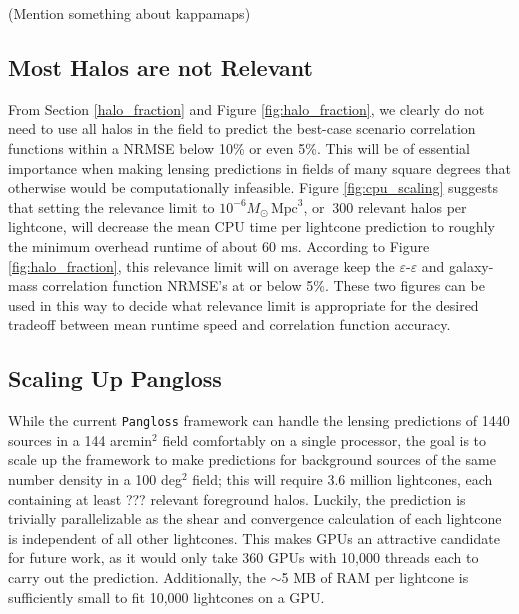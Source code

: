 \documentclass[%
 reprint,
 amsmath,amssymb,
 aps,nofootinbib
]{revtex4-1}
\begin{document}
(Mention something about kappamaps)


\subsection{Most Halos are not Relevant}

From Section \ref{halo_fraction} and Figure \ref{fig:halo_fraction}, we clearly do not need to use all halos in the field to predict the best-case scenario correlation functions within a NRMSE below 10\% or even 5\%. This will be of essential importance when making lensing predictions in fields of many square degrees that otherwise would be computationally infeasible. Figure \ref{fig:cpu_scaling} suggests that setting the relevance limit to ${10^{-6}M_\odot\,\text{Mpc}^3}$, or $~300$ relevant halos per lightcone, will decrease the mean CPU time per lightcone prediction to roughly the minimum overhead runtime of about 60 ms. According to Figure \ref{fig:halo_fraction}, this relevance limit will on average keep the $\varepsilon$-$\varepsilon$ and galaxy-mass correlation function NRMSE's at or below 5\%. These two figures can be used in this way to decide what relevance limit is appropriate for the desired tradeoff between mean runtime speed and correlation function accuracy. 


\subsection{Scaling Up Pangloss} \label{scaling_up}

While the current \texttt{Pangloss} framework can handle the lensing predictions of 1440 sources in a 144 arcmin$^2$ field comfortably on a single processor, the goal is to scale up the framework to make predictions for background sources of the same number density in a 100 deg$^2$ field; this will require 3.6 million lightcones, each containing at least ??? relevant foreground halos. Luckily, the prediction is trivially parallelizable as the shear and convergence calculation of each lightcone is independent of all other lightcones. This makes GPUs an attractive candidate for future work, as it would only take 360 GPUs with 10,000 threads each to carry out the prediction. Additionally, the $\sim$5 MB of RAM per lightcone is sufficiently small to fit 10,000 lightcones on a GPU.
\end{document}
